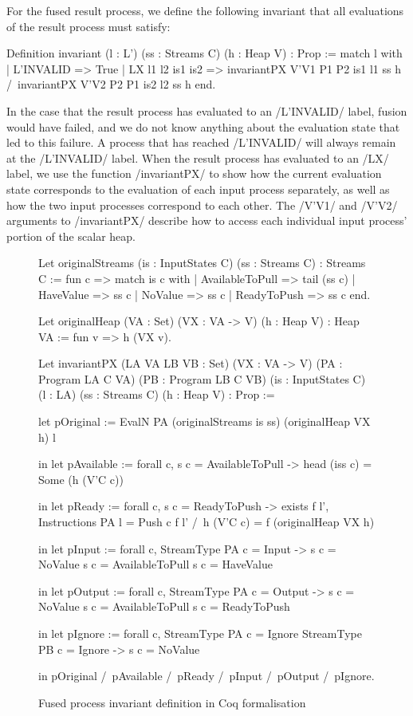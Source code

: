 For the fused result process, we define the following invariant that all evaluations of the result process must satisfy:
\begin{coq}
Definition invariant (l : L') (ss : Streams C) (h : Heap V) : Prop :=
 match l with
  | L'INVALID        => True
  | LX l1 l2 is1 is2 => invariantPX V'V1 P1 P2 is1 l1 ss h
                     /\ invariantPX V'V2 P2 P1 is2 l2 ss h
 end.
\end{coq}

In the case that the result process has evaluated to an \Hs/L'INVALID/ label, fusion would have failed, and we do not know anything about the evaluation state that led to this failure.
A process that has reached \Hs/L'INVALID/ will always remain at the \Hs/L'INVALID/ label.
When the result process has evaluated to an \Hs/LX/ label, we use the function \Hs/invariantPX/ to show how the current evaluation state corresponds to the evaluation of each input process separately, as well as how the two input processes correspond to each other.
The \Hs/V'V1/ and \Hs/V'V2/ arguments to \Hs/invariantPX/ describe how to access each individual input process' portion of the scalar heap.

\begin{figure}
\begin{coq}
Let originalStreams (is : InputStates C) (ss : Streams C) : Streams C :=
  fun c => match is c with
            | AvailableToPull => tail (ss c)
            | HaveValue       =>       ss c
            | NoValue         =>       ss c
            | ReadyToPush     =>       ss c
           end.

Let originalHeap (VA : Set) (VX : VA -> V) (h : Heap V) : Heap VA :=
  fun v => h (VX v).

Let invariantPX (LA VA LB VB : Set) (VX : VA -> V)
                (PA : Program LA C VA) (PB : Program LB C VB) (is : InputStates C)
                (l : LA) (ss : Streams C) (h : Heap V) : Prop :=

    let pOriginal  := EvalN PA (originalStreams is ss) (originalHeap VX h) l

 in let pAvailable := forall c, s c = AvailableToPull
                   -> head (iss c) = Some (h (V'C c))

 in let pReady     := forall c, s c = ReadyToPush
                   -> exists f l', Instructions PA l = Push c f l'
                   /\ h (V'C c) = f (originalHeap VX h)

 in let pInput     := forall c, StreamType PA c = Input
                   -> s c = NoValue \/ s c = AvailableToPull \/ s c = HaveValue

 in let pOutput    := forall c, StreamType PA c = Output
                   -> s c = NoValue \/ s c = AvailableToPull \/ s c = ReadyToPush

 in let pIgnore    := forall c,
                      StreamType PA c = Ignore \/ StreamType PB c = Ignore
                   -> s c = NoValue

 in pOriginal /\ pAvailable /\ pReady /\ pInput /\ pOutput /\ pIgnore.
\end{coq}
\caption{Fused process invariant definition in Coq formalisation}
\label{figs/coq/fused-invariant}
\end{figure}

